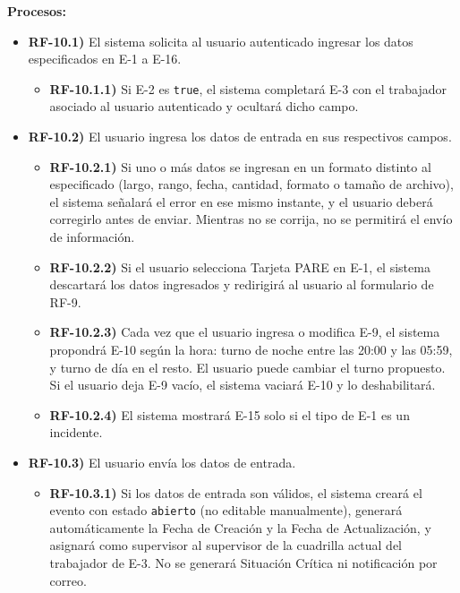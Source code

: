 \textbf{Procesos:}
\begin{itemize}[label={}, leftmargin=1.5em]
  \item \textbf{RF-10.1)} El sistema solicita al usuario autenticado ingresar los datos especificados en E-1 a E-16.
  \begin{itemize}[label={}, leftmargin=1.5em]
    \item \textbf{RF-10.1.1)} Si E-2 es \texttt{true}, el sistema completar\'a E-3 con el trabajador asociado al usuario autenticado y ocultar\'a dicho campo.
  \end{itemize}
  \item \textbf{RF-10.2)} El usuario ingresa los datos de entrada en sus respectivos campos.
  \begin{itemize}[label={}, leftmargin=1.5em]
    \item \textbf{RF-10.2.1)} Si uno o m\'as datos se ingresan en un formato distinto al especificado (largo, rango, fecha, cantidad, formato o tama\~no de archivo), el sistema se\~nalar\'a el error en ese mismo instante, y el usuario deber\'a corregirlo antes de enviar. Mientras no se corrija, no se permitir\'a el env\'io de informaci\'on.
    \item \textbf{RF-10.2.2)} Si el usuario selecciona Tarjeta PARE en E-1, el sistema descartar\'a los datos ingresados y redirigir\'a al usuario al formulario de RF-9.
    \item \textbf{RF-10.2.3)} Cada vez que el usuario ingresa o modifica E-9, el sistema propondr\'a E-10 seg\'un la hora: turno de noche entre las 20:00 y las 05:59, y turno de d\'ia en el resto. El usuario puede cambiar el turno propuesto. Si el usuario deja E-9 vac\'io, el sistema vaciar\'a E-10 y lo deshabilitar\'a.
    \item \textbf{RF-10.2.4)} El sistema mostrar\'a E-15 solo si el tipo de E-1 es un incidente.
  \end{itemize}
  \item \textbf{RF-10.3)} El usuario env\'ia los datos de entrada.
  \begin{itemize}[label={}, leftmargin=1.5em]
    \item \textbf{RF-10.3.1)} Si los datos de entrada son v\'alidos, el sistema crear\'a el evento con estado \texttt{abierto} (no editable manualmente), generar\'a autom\'aticamente la Fecha de Creaci\'on y la Fecha de Actualizaci\'on, y asignar\'a como supervisor al supervisor de la cuadrilla actual del trabajador de E-3. No se generar\'a Situaci\'on Cr\'itica ni notificaci\'on por correo.
    \begin{itemize}[label={}, leftmargin=1.5em]

\end{itemize}
\end{itemize}
\end{itemize}
